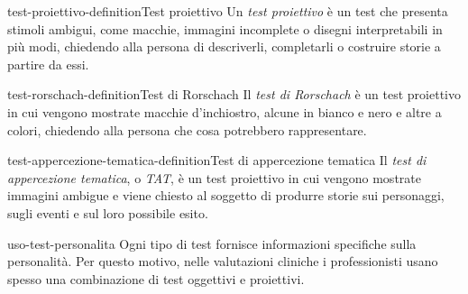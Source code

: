 \documentclass[preview]{standalone}
\begin{document}
\begin{snippetdefinition}{test-proiettivo-definition}{Test proiettivo}
    Un \emph{test proiettivo} è un test che presenta stimoli ambigui, come
    macchie, immagini incomplete o disegni interpretabili in più modi, chiedendo
    alla persona di descriverli, completarli o costruire storie a partire da
    essi.
\end{snippetdefinition}

\begin{snippetdefinition}{test-rorschach-definition}{Test di Rorschach}
    Il \emph{test di Rorschach} è un test proiettivo in cui vengono mostrate
    macchie d'inchiostro, alcune in bianco e nero e altre a colori, chiedendo
    alla persona che cosa potrebbero rappresentare.
\end{snippetdefinition}

\begin{snippetdefinition}{test-appercezione-tematica-definition}{Test di appercezione tematica}
    Il \emph{test di appercezione tematica}, o \emph{TAT}, è un test proiettivo
    in cui vengono mostrate immagini ambigue e viene chiesto al soggetto di
    produrre storie sui personaggi, sugli eventi e sul loro possibile esito.
\end{snippetdefinition}

\begin{snippet}{uso-test-personalita}
    Ogni tipo di test fornisce informazioni specifiche sulla personalità. Per
    questo motivo, nelle valutazioni cliniche i professionisti usano spesso una
    combinazione di test oggettivi e proiettivi.
\end{snippet}
\end{document}
